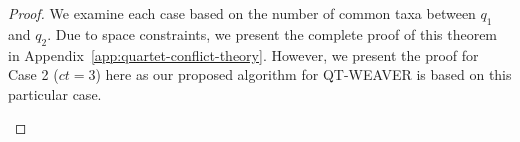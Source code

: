 \documentclass[10pt,a4paper]{article}
\newcommand{\add}[1]{{\color{blue} #1}}
\begin{document}
\begin{proof}


We examine each case based on the number of common taxa between $q_1$ and $q_2$. Due to space constraints, we present the complete proof of this theorem in Appendix~\ref{app:quartet-conflict-theory}. However, we present the proof for Case 2 ($ct=3$) here as our proposed algorithm for QT-WEAVER is based on this particular case.


\begin{itemize}






\end{itemize}
\end{proof}
\end{document}
